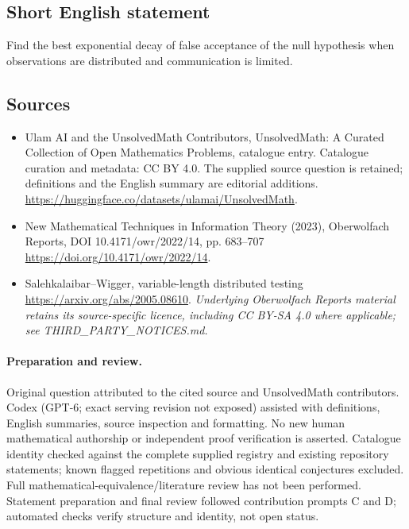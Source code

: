 \documentclass[11pt]{article}
\begin{document}
\subsection{Short English statement}
Find the best exponential decay of false acceptance of the null hypothesis when observations are distributed and communication is limited.
\subsection{Sources}
\begin{itemize}
\item[\hypertarget{source:statement:1}{S1}] Ulam AI and the UnsolvedMath Contributors, UnsolvedMath: A Curated Collection of Open Mathematics Problems, catalogue entry. Catalogue curation and metadata: CC BY 4.0. The supplied source question is retained; definitions and the English summary are editorial additions.
\url{https://huggingface.co/datasets/ulamai/UnsolvedMath}.
\item[\hypertarget{source:statement:2}{S2}] New Mathematical Techniques in Information Theory (2023), Oberwolfach Reports, DOI 10.4171/owr/2022/14, pp. 683--707
\url{https://doi.org/10.4171/owr/2022/14}.
\item[\hypertarget{source:statement:3}{S3}] Salehkalaibar--Wigger, variable-length distributed testing
\url{https://arxiv.org/abs/2005.08610}.
\textit{Underlying Oberwolfach Reports material retains its source-specific licence, including CC BY-SA 4.0 where applicable; see THIRD\_PARTY\_NOTICES.md.}
\end{itemize}
\paragraph{Preparation and review.}
Original question attributed to the cited source and UnsolvedMath contributors. Codex (GPT-6; exact serving revision not exposed) assisted with definitions, English summaries, source inspection and formatting. No new human mathematical authorship or independent proof verification is asserted. Catalogue identity checked against the complete supplied registry and existing repository statements; known flagged repetitions and obvious identical conjectures excluded. Full mathematical-equivalence/literature review has not been performed. Statement preparation and final review followed contribution prompts C and D; automated checks verify structure and identity, not open status.
\label{end:statement}
\end{document}
